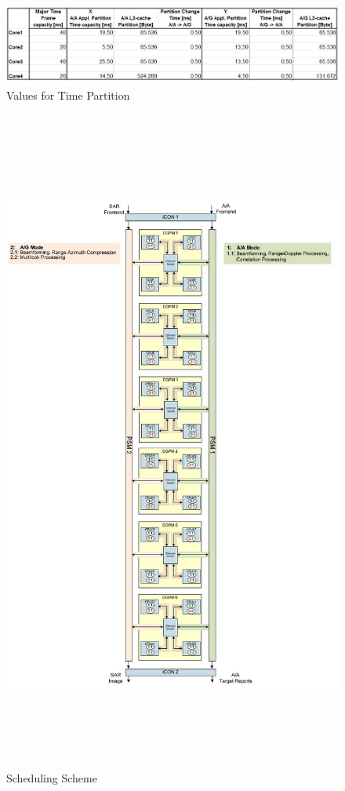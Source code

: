 \begin{figure}[h!]
	\centering
	\includegraphics[width=150mm]{figures/scheme2_partition_values}
	\caption{Values for Time Partition}
	\label{fig:existing_analysis:scheme2_partition_values}
\end{figure}

\begin{figure}[h!]
	\centering
	\includegraphics[width=160mm, height=220mm]{figures/scheme2_mode_mapping}
	\caption{Scheduling Scheme}
	\label{fig:existing_analysis:scheme2_mode_mapping}
\end{figure}
\clearpage

